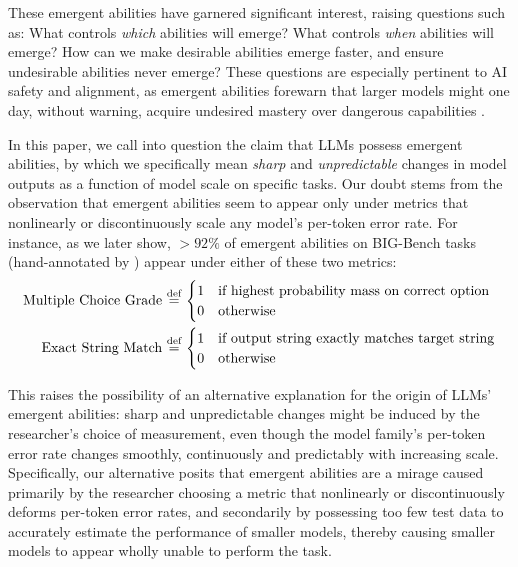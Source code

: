 These emergent abilities have garnered significant interest, raising questions such as: What controls \textit{which} abilities will emerge?
What controls \textit{when} abilities will emerge? 
How can we make desirable abilities emerge faster, and ensure undesirable abilities never emerge? 
These questions are especially pertinent to AI safety and alignment, as emergent abilities forewarn that larger models might one day, without warning, acquire undesired mastery over dangerous capabilities \cite{steinhardt2022future,hendrycks2022emergent, krakovna2022sharp1, krakovna2022sharp2}.

In this paper, we call into question the claim that LLMs possess emergent abilities, by which we specifically mean \textit{sharp} and \textit{unpredictable} changes in model outputs as a function of model scale on specific tasks.
Our doubt stems from the observation that emergent abilities seem to appear only under metrics that nonlinearly or discontinuously scale any model's per-token error rate.
For instance, as we later show, $>92\%$ of emergent abilities on BIG-Bench tasks \cite{srivastava2022beyond} (hand-annotated by \cite{wei2022bigbench}) appear under either of these two metrics:
%
\begin{align*}
    \text{Multiple Choice Grade} \, &\operatorname{\stackrel{\text{def}}{=}} \, \begin{cases} 1 & \text{if highest probability mass on correct option} \\ 0 & \text{otherwise} \end{cases}\\
    \text{Exact String Match} \, &\operatorname{\stackrel{\text{def}}{=}} \, \begin{cases} 1 & \text{if output string exactly matches target string} \\ 0 & \text{otherwise} \end{cases}
\end{align*}

This raises the possibility of an alternative explanation for the origin of LLMs' emergent abilities: sharp and unpredictable changes might be induced by the researcher's choice of measurement, even though the model family's per-token error rate changes smoothly, continuously and predictably with increasing scale. 
Specifically, our alternative posits that emergent abilities are a mirage caused primarily by the researcher choosing a metric that nonlinearly or discontinuously deforms per-token error rates, and secondarily by possessing too few test data to accurately estimate the performance of smaller models, thereby causing smaller models to appear wholly unable to perform the task.

